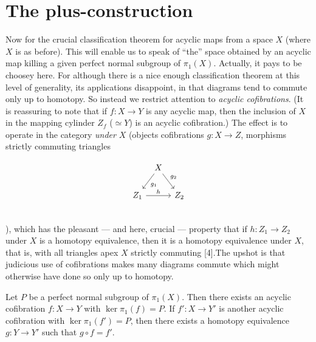 \chapter{The plus-construction} %
\label{cha:5the_plus_construction}
Now for the crucial classification theorem for acyclic maps from a space $X$ (where $X$ is as before). This will enable us to speak of ``the'' space obtained by an acyclic map killing a given perfect normal subgroup of $\pi_1(X)$. Actually, it pays to be choosey here. For although there is a
nice enough classification theorem at this level of generality, its applications disappoint, in that diagrams tend to commute only up to homotopy. So instead we restrict attention to {\em acyclic cofibrations}. (It is reassuring to note that if $f\colon   X \longrightarrow Y$ is any acyclic map, then the inclusion of $X$ in the mapping cylinder $Z_f$ ($\simeq Y$) is an acyclic cofibration.) The effect is to operate in the category {\em under} $X$ (objects cofibrations $g \colon   X \longrightarrow Z$, morphisms strictly commuting triangles

\[
\begin{tikzcd}[column sep=tiny]
& X \arrow[dl,"g_1"] \arrow{dr}{g_2}& \\
Z_1 \arrow{rr}{h}  & &Z_2 \\
\end{tikzcd}
\]
),
which has the pleasant --- and here, crucial --- property that if $h \colon   Z_1\longrightarrow Z_2$ under $X$ is a homotopy equivalence, then it is a homotopy equivalence under $X$, that is, with all triangles apex $X$ strictly commuting [4].The upshot is that judicious use of cofibrations makes many diagrams commute which might otherwise have done so only up to homotopy.

\begin{theorem}
Let $P$ be a perfect normal subgroup of $\pi_1 (X)$. Then there exists an acyclic cofibration $f\colon   X \longrightarrow  Y$ with $\ker \pi_1 (f) = P$. If $f'\colon   X \longrightarrow Y'$ is another acyclic cofibration with $\ker \pi_1(f') = P$, then there exists a homotopy equivalence $g \colon   Y \longrightarrow Y'$ such that $g\circ f =f'$.
\end{theorem}

